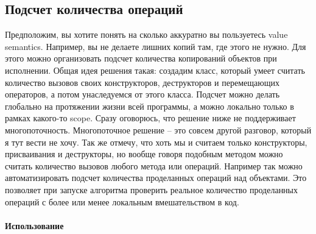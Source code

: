 \subsection{Подсчет количества операций}
\label{section::OpCounting}

Предположим, вы хотите понять на сколько аккуратно вы пользуетесь value semantics.
Например, вы не делаете лишних копий там, где этого не нужно.
Для этого можно организовать подсчет количества копирований объектов при исполнении.
Общая идея решения такая: создадим класс, который умеет считать количество вызовов своих конструкторов, деструкторов и перемещающих операторов, а потом унаследуемся от этого класса.
Подсчет можно делать глобально на протяжении жизни всей программы, а можно локально только в рамках какого-то scope.
Сразу оговорюсь, что решение ниже не поддерживает многопоточность.
Многопоточное решение -- это совсем другой разговор, который я тут вести не хочу.
Так же отмечу, что хоть мы и считаем только конструкторы, присваивания и деструкторы, но вообще говоря подобным методом можно считать количество вызовов любого метода или операций.
Например так можно автоматизировать подсчет количества проделанных операций над объектами.
Это позволяет при запуске алгоритма проверить реальное количество проделанных операций с более или менее локальным вмешательством в код.

\paragraph{Использование}

